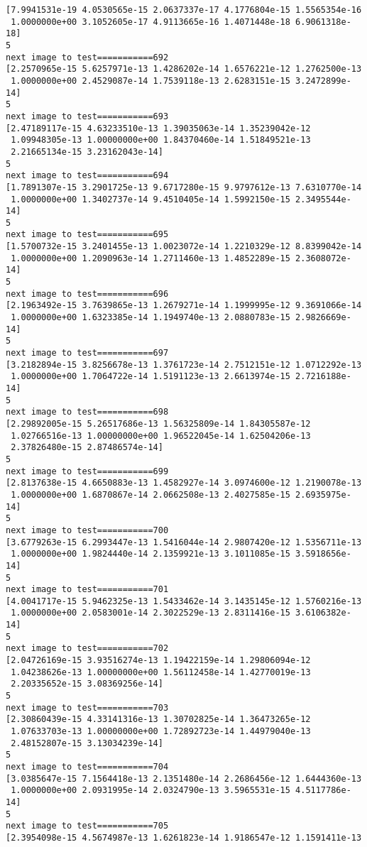 \documentclass[11pt]{article}
\begin{document}
\begin{Verbatim}[commandchars=\\\{\}]
[7.9941531e-19 4.0530565e-15 2.0637337e-17 4.1776804e-15 1.5565354e-16
 1.0000000e+00 3.1052605e-17 4.9113665e-16 1.4071448e-18 6.9061318e-18]
5
next image to test===========692
[2.2570965e-15 5.6257971e-13 1.4286202e-14 1.6576221e-12 1.2762500e-13
 1.0000000e+00 2.4529087e-14 1.7539118e-13 2.6283151e-15 3.2472899e-14]
5
next image to test===========693
[2.47189117e-15 4.63233510e-13 1.39035063e-14 1.35239042e-12
 1.09948305e-13 1.00000000e+00 1.84370460e-14 1.51849521e-13
 2.21665134e-15 3.23162043e-14]
5
next image to test===========694
[1.7891307e-15 3.2901725e-13 9.6717280e-15 9.9797612e-13 7.6310770e-14
 1.0000000e+00 1.3402737e-14 9.4510405e-14 1.5992150e-15 2.3495544e-14]
5
next image to test===========695
[1.5700732e-15 3.2401455e-13 1.0023072e-14 1.2210329e-12 8.8399042e-14
 1.0000000e+00 1.2090963e-14 1.2711460e-13 1.4852289e-15 2.3608072e-14]
5
next image to test===========696
[2.1963492e-15 3.7639865e-13 1.2679271e-14 1.1999995e-12 9.3691066e-14
 1.0000000e+00 1.6323385e-14 1.1949740e-13 2.0880783e-15 2.9826669e-14]
5
next image to test===========697
[3.2182894e-15 3.8256678e-13 1.3761723e-14 2.7512151e-12 1.0712292e-13
 1.0000000e+00 1.7064722e-14 1.5191123e-13 2.6613974e-15 2.7216188e-14]
5
next image to test===========698
[2.29892005e-15 5.26517686e-13 1.56325809e-14 1.84305587e-12
 1.02766516e-13 1.00000000e+00 1.96522045e-14 1.62504206e-13
 2.37826480e-15 2.87486574e-14]
5
next image to test===========699
[2.8137638e-15 4.6650883e-13 1.4582927e-14 3.0974600e-12 1.2190078e-13
 1.0000000e+00 1.6870867e-14 2.0662508e-13 2.4027585e-15 2.6935975e-14]
5
next image to test===========700
[3.6779263e-15 6.2993447e-13 1.5416044e-14 2.9807420e-12 1.5356711e-13
 1.0000000e+00 1.9824440e-14 2.1359921e-13 3.1011085e-15 3.5918656e-14]
5
next image to test===========701
[4.0041717e-15 5.9462325e-13 1.5433462e-14 3.1435145e-12 1.5760216e-13
 1.0000000e+00 2.0583001e-14 2.3022529e-13 2.8311416e-15 3.6106382e-14]
5
next image to test===========702
[2.04726169e-15 3.93516274e-13 1.19422159e-14 1.29806094e-12
 1.04238626e-13 1.00000000e+00 1.56112458e-14 1.42770019e-13
 2.20335652e-15 3.08369256e-14]
5
next image to test===========703
[2.30860439e-15 4.33141316e-13 1.30702825e-14 1.36473265e-12
 1.07633703e-13 1.00000000e+00 1.72892723e-14 1.44979040e-13
 2.48152807e-15 3.13034239e-14]
5
next image to test===========704
[3.0385647e-15 7.1564418e-13 2.1351480e-14 2.2686456e-12 1.6444360e-13
 1.0000000e+00 2.0931995e-14 2.0324790e-13 3.5965531e-15 4.5117786e-14]
5
next image to test===========705
[2.3954098e-15 4.5674987e-13 1.6261823e-14 1.9186547e-12 1.1591411e-13

\end{Verbatim}
\end{document}
